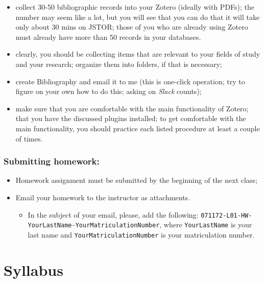 \documentclass[
]{book}
\providecommand{\tightlist}{%
  \setlength{\itemsep}{0pt}\setlength{\parskip}{0pt}}
\begin{document}
\begin{itemize}
\tightlist
\item
  collect 30-50 bibliographic records into your Zotero (ideally with PDFs); the number may seem like a lot, but you will see that you can do that it will take only about 30 mins on JSTOR; those of you who are already using Zotero must already have more than 50 records in your databases.
\item
  clearly, you should be collecting items that are relevant to your fields of study and your research; organize them into folders, if that is necessary;
\item
  create Bibliography and email it to me (this is one-click operation; try to figure on your own how to do this; asking on \emph{Slack} counts);
\item
  make sure that you are comfortable with the main functionality of Zotero; that you have the discussed plugins installed; to get comfortable with the main functionality, you should practice each listed procedure at least a couple of times.
\end{itemize}

\hypertarget{submitting-homework}{%
\subsection{Submitting homework:}\label{submitting-homework}}

\begin{itemize}
\tightlist
\item
  Homework assignment must be submitted by the beginning of the next class;
\item
  Email your homework to the instructor as attachments.

  \begin{itemize}
  \tightlist
  \item
    In the subject of your email, please, add the following: \texttt{071172-L01-HW-YourLastName-YourMatriculationNumber}, where \texttt{YourLastName} is your last name and \texttt{YourMatriculationNumber} is your matriculation number.
  \end{itemize}
\end{itemize}

\hypertarget{syllabus}{%
\chapter*{Syllabus}\label{syllabus}}
\end{document}
